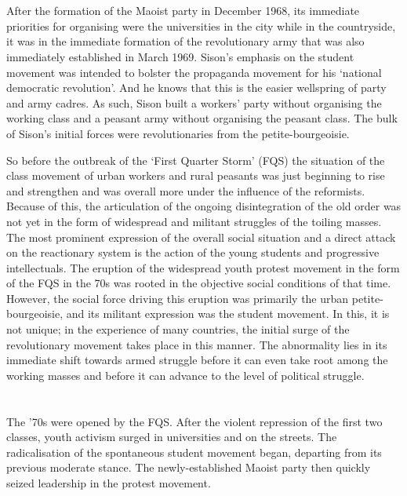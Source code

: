 \section{}
After the formation of the Maoist party in December 1968, 
its immediate priorities for organising 
were the universities in the city
while in the countryside, 
it was in the immediate formation 
of the revolutionary army 
that was also immediately established in March 1969. 
Sison's emphasis on the student movement 
was intended to bolster the propaganda movement 
for his `national democratic revolution'.
And he knows that this is the easier wellspring of party and army cadres. 
As such, Sison built a workers' party without organising the working class
and a peasant army without organising the peasant class. 
The bulk of Sison's initial forces 
were revolutionaries from the petite-bourgeoisie.

So before the outbreak of the `First Quarter Storm' (FQS) 
the situation of the class movement of urban workers and rural peasants 
was just beginning to rise and strengthen 
and was overall more under the influence of the reformists. 
Because of this, 
the articulation of the ongoing disintegration of the old order
was not yet in the form 
of widespread and militant struggles of the toiling masses.
The most prominent expression 
of the overall social situation 
and a direct attack on the reactionary system 
is the action of the young students and progressive intellectuals. 
The eruption of the widespread youth protest movement 
in the form of the FQS in the 70s 
was rooted in the objective social conditions of that time. 
However, the social force driving this eruption 
was primarily the urban petite-bourgeoisie, 
and its militant expression was the student movement. 
In this, it is not unique;
in the experience of many countries, 
the initial surge of the revolutionary movement 
takes place in this manner. 
The abnormality lies in its immediate shift 
towards armed struggle 
before it can even take root among the working masses 
and before it can advance to the level of political struggle.


\section{}
The '70s were opened by the FQS. 
After the violent repression of the first two classes, 
youth activism surged in universities and on the streets. 
The radicalisation of the spontaneous student movement began, 
departing from its previous moderate stance. 
The newly-established Maoist party 
then quickly seized leadership in the protest movement.

